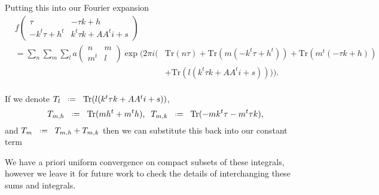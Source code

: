 Putting this into our Fourier expansion
\begin{align*}
	&f\begin{pmatrix} \tau & -\tau k + h\\ -k^t \tau + h^t & k^t \tau k + A A^t i + s \end{pmatrix} \\
	&= \sum_{n} \sum_{m} \sum_{l} a\begin{pmatrix} n & m\\ m^t & l \end{pmatrix} \exp \Big(2\pi i \big( &\mathrm{Tr} (n\tau) +  \mathrm{Tr} (m(-k^t \tau + h^t )) +  \mathrm{Tr} (m^t(-\tau k + h)) \\ & &  +  \mathrm{Tr} (l( k^t \tau k + A A^t i + s))\big)\Big) . \\
\end{align*}

If we denote \(T_l \defeq \mathrm{Tr} (l( k^t \tau k + A A^t i + s))\),
\[T_{m,h}\defeq \mathrm{Tr}(mh^t + m^th), \;\; T_{m,k} \defeq \mathrm{Tr}(-mk^t\tau - m^t\tau k) , \]
and \(T_m \defeq T_{m,h} + T_{m,k}\) then we can substitute this back into our constant term
\begin{remark}
	We have a priori uniform convergence on compact subsets of these integrals, however we leave it for future work to check the details of interchanging these sums and integrals.
\end{remark}

